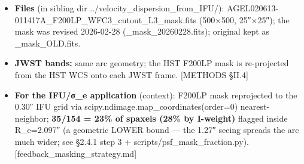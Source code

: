 \documentclass[
]{article}
\providecommand{\tightlist}{%
  \setlength{\itemsep}{0pt}\setlength{\parskip}{0pt}}
\newcommand{\BreakablePath}[1]{{\ttfamily\sloppy #1}}
\begin{document}
\begin{itemize}
  \begin{itemize}
  \tightlist
  \item
    \textbf{(A) 2-component (bulge+disk) Sérsic + residual-only IR
    growth} --- over-masks: residual-only growth grabs red galaxy body +
    a companion (F150W2 15768 px, F322W2 4258 px) → raw biased low
    (11.16) and a large +0.31 fill-in. The bulge+disk was never physical
    for this elliptical; it was a kludge to tame the residual growth.
  \item
    \textbf{(B) single-Sérsic with a broken fit (amplitude→0) + color
    gate} --- DISCARDED artifact: the near-zero model made the residual
    term meaningless and collapsed the fill-in to \textasciitilde0.01
    mag (apparent 11.34 ± 0.013). Caught via the black model panel in
    the diagnostic figures.
  \item
    \textbf{(C) single-Sérsic (fixed init) + color-gated IR growth + WCS
    registration} --- FINAL: tighter, arc-focused, correctly-registered
    masks (F150W2 7698 px, F322W2 1997 px; companion now masked), raw
    central 11.36 \textbf{consistent with the validated expert hand-mask
    11.33}, fill real but smaller (−0.19 to −0.28), masking systematic
    ±0.086 (vs ±0.16 for 2-comp). Physically motivated (single Sérsic) +
    physically-gated (source color) + astrometrically registered
    (§2.1.1b).
  \end{itemize}
\item
  \textbf{Files} (in sibling dir
  \BreakablePath{.\discretionary{}{}{}.\discretionary{}{}{}/\discretionary{}{}{}velocity\_\discretionary{}{}{}dispersion\_\discretionary{}{}{}from\_\discretionary{}{}{}IFU/\discretionary{}{}{}}):
  \BreakablePath{AGEL020613-\discretionary{}{}{}011417A\_\discretionary{}{}{}F200LP\_\discretionary{}{}{}WFC3\_\discretionary{}{}{}cutout\_\discretionary{}{}{}L3\_\discretionary{}{}{}mask.\discretionary{}{}{}fits}
  (500×500, 25″×25″); the mask was revised 2026-02-28
  (\BreakablePath{\_\discretionary{}{}{}mask\_\discretionary{}{}{}20260228.\discretionary{}{}{}fits});
  original kept as
  \BreakablePath{\_\discretionary{}{}{}mask\_\discretionary{}{}{}OLD.\discretionary{}{}{}fits}.
\item
  \textbf{JWST bands:} same arc geometry; the HST F200LP mask is
  re-projected from the HST WCS onto each JWST frame. {[}METHODS
  §II.4{]}
\item
  \textbf{For the IFU/σ\_e application} (context): F200LP mask
  reprojected to the 0.30″ IFU grid via
  \BreakablePath{scipy.\discretionary{}{}{}ndimage.\discretionary{}{}{}map\_\discretionary{}{}{}coordinates(order=0)}
  nearest-neighbor; \textbf{35/154 = 23\% of spaxels (28\% by I-weight)}
  flagged inside R\_e=2.097″ (a geometric LOWER bound --- the 1.27″
  seeing spreads the arc much wider; see §2.4.1 step 3 +
  \BreakablePath{scripts/\discretionary{}{}{}psf\_\discretionary{}{}{}mask\_\discretionary{}{}{}fraction.\discretionary{}{}{}py}).
  {[}feedback\_masking\_strategy.md{]}
\end{itemize}
\end{document}
